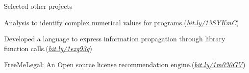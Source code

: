 \documentclass{resume} %
\begin{document}
\begin{rSection}{Selected other projects}\smallskip \begin{lSubsection}
%
\item Analysis to identify complex numerical values for \matlab programs.(\href{
https://github.com/Sable/mclab/tree/master/languages/Natlab/src/natlab/tame/valueanalysis/components/isComplex}{\em{bit.ly/15SYKmC}}) 
\begin{lsubSubsection}
\item Developed a language to express information propagation through library
function calls.(\href{http://bit.ly/1ezq93q}{\em{bit.ly/1ezq93q}})
\end{lsubSubsection}

\item FreeMeLegal: An Open source license recommendation
engine.(\href{http://bit.ly/1m030GV}{\em{bit.ly/1m030GV}}) 
\end{lSubsection}
\end{rSection}

\end{document}

